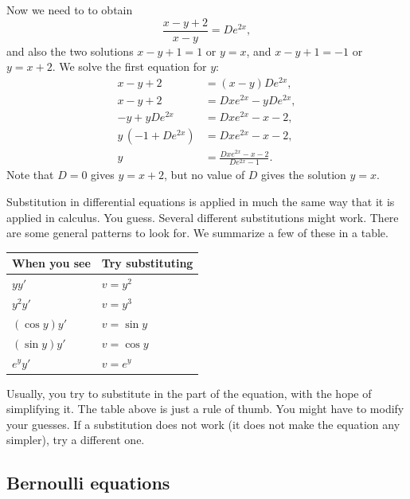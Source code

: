 Now we need to  to obtain
\begin{equation*}
\frac{x-y+2}{x-y} = D e^{2x} ,
\end{equation*}
and also the two solutions $x-y+1=1$ or $y=x$, and $x-y+1=-1$ or $y=x+2$.
We solve the first equation for $y$:
\begin{equation*}
\begin{aligned}
x-y+2 &= (x-y)D e^{2x} , \\
x-y+2 &= Dx e^{2x}-yD e^{2x} , \\
-y + yD e^{2x} &= Dx e^{2x} - x - 2 , \\
y\,(-1+ D e^{2x}) &= Dx e^{2x} - x - 2 , \\
y  &= \frac{Dx e^{2x} - x - 2}{D e^{2x}-1} .
\end{aligned}
\end{equation*}
Note that $D=0$ gives $y=x+2$, but no value of $D$ gives the solution $y=x$.

\medskip

Substitution in differential equations is applied in much the same way that
it is applied in calculus.  You guess.  Several different substitutions might
work.  There are some general patterns to look for.  We summarize a few
of these in a table.

\begin{center}
\begin{tabular}{@{}ll@{}}
\toprule
When you see & Try substituting \\
\midrule
$yy'$ & $v=y^2$ \\
$y^2y'$ & $v=y^3$ \\
$(\cos y)y'$ & $v=\sin y$ \\
$(\sin y)y'$ & $v=\cos y$ \\
$e^y y'$ & $v=e^y$ \\ \bottomrule
\end{tabular}
\end{center}

Usually, you try to substitute in the  part of the
equation, with the hope of simplifying it.  The table above is just a rule
of thumb.  You might have to modify your guesses.  If a substitution
does not work (it does not make the equation any simpler), try a different one.

\subsection{Bernoulli equations}

